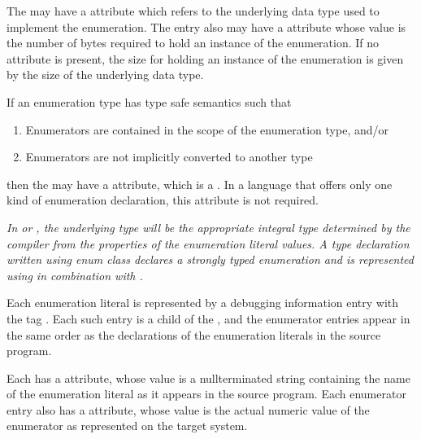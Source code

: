 The 
may have 
a \DWATtype{} attribute
which refers to the underlying data type used to implement
the enumeration. The entry also may have a 
\DWATbytesize{} attribute whose 
 value is the number of bytes 
required to hold an instance of the enumeration. If no \DWATbytesize{} attribute 
is present, the size for holding an instance of the enumeration is given by the size 
of the underlying data type.

If an enumeration type has type safe 
semantics such that

\begin{enumerate}[1. ]
\item Enumerators are contained in the scope of the enumeration type, and/or

\item Enumerators are not implicitly converted to another type
\end{enumerate}

then the  may 
have a \DWATenumclass{}
attribute, which is a . 
In a language that offers only
one kind of enumeration declaration, this attribute is not
required.

\textit{In  or , 
the underlying type will be the appropriate
integral type determined by the compiler from the properties of
\hypertarget{chap:DWATenumclasstypesafeenumerationdefinition}{}
the enumeration literal values. 
A  type declaration written
using enum class declares a strongly typed enumeration and
is represented using \DWTAGenumerationtype{} 
in combination with \DWATenumclass.}

Each enumeration literal is represented by a debugging
information entry with the 
tag \DWTAGenumeratorTARG. 
Each
such entry is a child of the 
, and the
enumerator entries appear in the same order as the declarations
of the enumeration literals in the source program.

Each  has a 
\DWATname{} attribute, whose
value is a null\dash terminated string containing the name of the
\hypertarget{chap:DWATconstvalueenumerationliteralvalue}{}
enumeration literal as it appears in the source program. 
Each enumerator entry also has a 
\DWATconstvalue{} attribute,
whose value is the actual numeric value of the enumerator as
represented on the target system.


